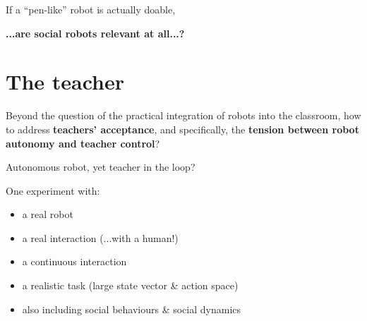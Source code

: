 \documentclass[compress]{beamer}
\begin{document}
 \begin{frame}[plain]{}

     \centering
    If a ``pen-like'' robot is actually doable,


     \Large\bf
     ...are social robots relevant at all...?
 \end{frame}

%

\section{The teacher}


{
\begin{frame}[plain]
    \Large
    Beyond the question of the practical integration of robots into the
    classroom, how to address \textbf{teachers' acceptance}, and specifically, the \textbf{tension between robot autonomy and teacher
    control}?

\end{frame}
}


\begin{frame}{Autonomous robot, yet teacher in the loop?}

    One experiment with:
    
    \begin{itemize}
        \item<+-> a real robot
        \item<+-> a real interaction (...with a human!)
        \item<+-> a continuous interaction
        \item<+-> a realistic task (large state vector \& action space)
        \item<+-> also including social behaviours \& social dynamics
    \end{itemize}

\end{frame}
\end{document}
